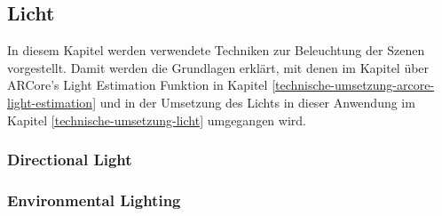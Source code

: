 \subsection{Licht}
In diesem Kapitel werden verwendete Techniken zur Beleuchtung der Szenen vorgestellt. Damit werden die Grundlagen erklärt, mit denen im Kapitel über ARCore's Light Estimation Funktion in Kapitel \ref*{technische-umsetzung-arcore-light-estimation} und in der Umsetzung des Lichts in dieser Anwendung im Kapitel \ref*{technische-umsetzung-licht} umgegangen wird.

\subsubsection{Directional Light}

\subsubsection{Environmental Lighting}